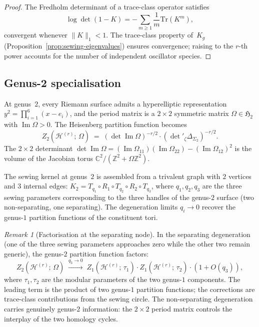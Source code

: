 \documentclass[11pt,reqno]{amsart}
\theoremstyle{definition}
\theoremstyle{remark}
\newtheorem{remark}[theorem]{Remark}
\newcommand{\cH}{\mathcal{H}}
\newcommand{\bC}{\mathbb{C}}
\newcommand{\bZ}{\mathbb{Z}}
\newcommand{\Tr}{\mathrm{Tr}}
\newcommand{\fH}{\mathfrak{H}}
\numberwithin{equation}{section}
\begin{document}
\begin{proof}
The Fredholm determinant of a trace-class operator satisfies
\[
\log\det(1 - K)
  = -\sum_{m \geq 1} \frac{1}{m}\Tr(K^m),
\]
convergent whenever $\|K\|_1 < 1$.  The trace-class property
of~$K_g$ (Proposition~\ref{prop:sewing-eigenvalues}) ensures
convergence; raising to the $r$-th power accounts for the number of
independent oscillator species.
\end{proof}

\subsection{Genus-2 specialisation}\label{subsec:genus-2}

At genus~$2$, every Riemann surface admits a hyperelliptic
representation $y^2 = \prod_{i=1}^6(x - e_i)$, and the period
matrix is a $2 \times 2$ symmetric matrix
$\Omega \in \fH_2$ with $\operatorname{Im}\Omega > 0$.  The
Heisenberg partition function becomes
\begin{equation}\label{eq:genus-2-heisenberg}
Z_2(\cH^{(r)};\,\Omega)
\;=\;
(\det\operatorname{Im}\Omega)^{-r/2}
\cdot (\det{}'_\zeta \Delta_{\Sigma_2})^{-r/2}.
\end{equation}
The $2 \times 2$ determinant
$\det\operatorname{Im}\Omega
= (\operatorname{Im}\Omega_{11})
(\operatorname{Im}\Omega_{22})
- (\operatorname{Im}\Omega_{12})^2$
is the volume of the Jacobian torus
$\bC^2/(\bZ^2 + \Omega\bZ^2)$.

The sewing kernel at genus~$2$ is assembled from a trivalent
graph with $2$ vertices and $3$ internal edges:
$K_2 = T_{q_1}\circ R_1\circ T_{q_2}\circ R_2\circ T_{q_3}$,
where $q_1, q_2, q_3$ are the three sewing parameters
corresponding to the three handles of the genus-$2$ surface
(two non-separating, one separating).  The degeneration limits
$q_i \to 0$ recover the genus-$1$ partition functions of the
constituent tori.

\begin{remark}[Factorisation at the separating
 node]\label{rem:separating-node}
In the separating degeneration (one of the three sewing
parameters approaches zero while the other two remain generic),
the genus-$2$ partition function factors:
\[
Z_2(\cH^{(r)};\,\Omega)
\;\xrightarrow{q_3 \to 0}\;
Z_1(\cH^{(r)};\,\tau_1) \cdot Z_1(\cH^{(r)};\,\tau_2) \cdot
(1 + O(q_3)),
\]
where $\tau_1, \tau_2$ are the modular parameters of the two
genus-$1$ components.  The leading term is the product of
two genus-$1$ partition functions; the corrections are
trace-class contributions from the sewing circle.  The
non-separating degeneration carries genuinely genus-$2$
information: the $2 \times 2$ period matrix controls the
interplay of the two homology cycles.
\end{remark}
\end{document}
